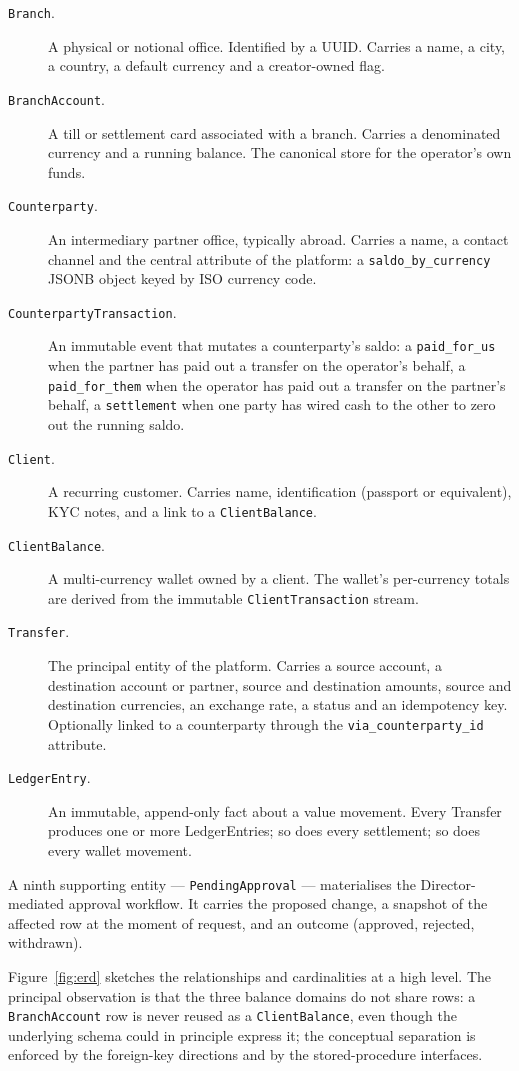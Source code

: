 \begin{description}
  \item[\texttt{Branch}.] A physical or notional office. Identified by a UUID. Carries a name, a city, a country, a default currency and a creator-owned flag.
  \item[\texttt{BranchAccount}.] A till or settlement card associated with a branch. Carries a denominated currency and a running balance. The canonical store for the operator's own funds.
  \item[\texttt{Counterparty}.] An intermediary partner office, typically abroad. Carries a name, a contact channel and the central attribute of the platform: a \texttt{saldo\_by\_currency} JSONB object keyed by ISO currency code.
  \item[\texttt{CounterpartyTransaction}.] An immutable event that mutates a counterparty's saldo: a \texttt{paid\_for\_us} when the partner has paid out a transfer on the operator's behalf, a \texttt{paid\_for\_them} when the operator has paid out a transfer on the partner's behalf, a \texttt{settlement} when one party has wired cash to the other to zero out the running saldo.
  \item[\texttt{Client}.] A recurring customer. Carries name, identification (passport or equivalent), KYC notes, and a link to a \texttt{ClientBalance}.
  \item[\texttt{ClientBalance}.] A multi-currency wallet owned by a client. The wallet's per-currency totals are derived from the immutable \texttt{ClientTransaction} stream.
  \item[\texttt{Transfer}.] The principal entity of the platform. Carries a source account, a destination account or partner, source and destination amounts, source and destination currencies, an exchange rate, a status and an idempotency key. Optionally linked to a counterparty through the \texttt{via\_counterparty\_id} attribute.
  \item[\texttt{LedgerEntry}.] An immutable, append-only fact about a value movement. Every Transfer produces one or more LedgerEntries; so does every settlement; so does every wallet movement.
\end{description}

A ninth supporting entity --- \texttt{PendingApproval} --- materialises the Director-mediated approval workflow. It carries the proposed change, a snapshot of the affected row at the moment of request, and an outcome (approved, rejected, withdrawn).

Figure~\ref{fig:erd} sketches the relationships and cardinalities at a high level. The principal observation is that the three balance domains do not share rows: a \texttt{BranchAccount} row is never reused as a \texttt{ClientBalance}, even though the underlying schema could in principle express it; the conceptual separation is enforced by the foreign-key directions and by the stored-procedure interfaces.

